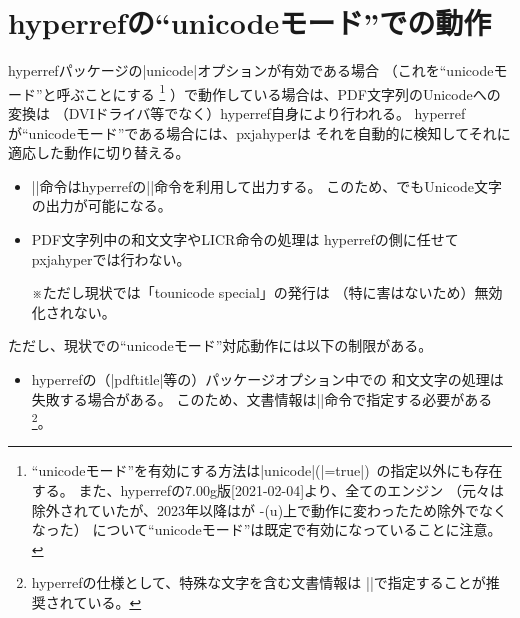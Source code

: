 \documentclass[uplatex,dvipdfmx,a4paper]{jsarticle}
\newcommand{\Pkg}[1]{\textsf{#1}}
\newcommand{\Note}{\par\noindent ※}
\newcommand{\／}{\mbox{}／\mbox{}}
\begin{document}
\section{hyperrefの“unicodeモード”での動作}
\label{sec:Unicode-mode}

\Pkg{hyperref}パッケージの|unicode|オプションが有効である場合
（これを“unicodeモード”と呼ぶことにする
\footnote{“unicodeモード”を有効にする方法は|unicode|(|=true|)\,%
  の指定以外にも存在する。
  また、\Pkg{hyperref}の7.00g版[2021-02-04]より、全てのエンジン
  （元々{\pLaTeX}は除外されていたが、2023年以降は{\pLaTeX}が
  {\TLe-(u)\pTeX}上で動作に変わったため除外でなくなった）
  について“unicodeモード”は既定で有効になっていることに注意。}%
）で動作している場合は、PDF文字列のUnicodeへの変換は
（DVIドライバ等でなく）\Pkg{hyperref}自身により行われる。
\Pkg{hyperref}が“unicodeモード”である場合には、\Pkg{pxjahyper}は
それを自動的に検知してそれに適応した動作に切り替える。
\begin{itemize}
\item |\Ux|命令は\Pkg{hyperref}の|\unichar|命令を利用して出力する。
  このため、{\pLaTeX}でもUnicode文字の出力が可能になる。
\item PDF文字列中の和文文字やLICR命令の処理は
  \Pkg{hyperref}の側に任せて\Pkg{pxjahyper}では行わない。
  \Note ただし現状では「tounicode special」の発行は
  （特に害はないため）無効化されない。
\end{itemize}
ただし、現状での“unicodeモード”対応動作には以下の制限がある。
\begin{itemize}
\item \Pkg{hyperref}の（|pdftitle|等の）パッケージオプション中での
  和文文字の処理は失敗する場合がある。
  このため、文書情報は|\hypersetup|命令で指定する必要がある
  \footnote{\Pkg{hyperref}の仕様として、特殊な文字を含む文書情報は
  |\hypersetup|で指定することが推奨されている。}。
\end{itemize}
\end{document}
